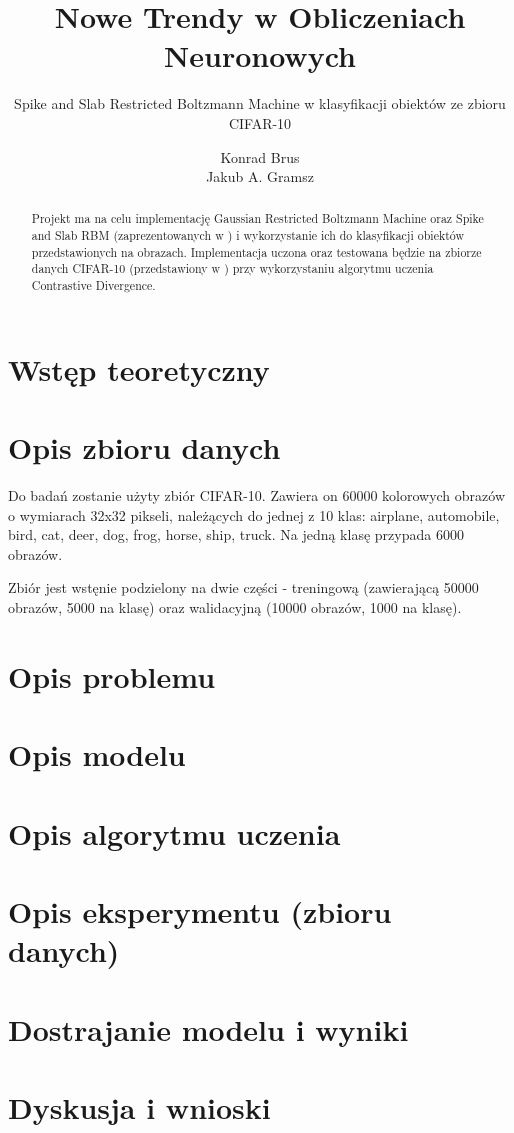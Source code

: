 \documentclass[a4paper,10pt]{article} %
\title{Nowe Trendy w Obliczeniach Neuronowych}
\subtitle{Spike and Slab Restricted Boltzmann Machine w klasyfikacji obiektów ze zbioru CIFAR-10}
\author{Konrad Brus \\ Jakub A. Gramsz}
\begin{document}
\maketitle

\begin{abstract}
Projekt ma na celu implementację Gaussian Restricted Boltzmann Machine oraz Spike and Slab RBM (zaprezentowanych w \cite{courville2013spike}) i wykorzystanie ich do klasyfikacji obiektów przedstawionych na obrazach. Implementacja uczona oraz testowana będzie na zbiorze danych CIFAR-10 (przedstawiony w \cite{cifar}) przy wykorzystaniu algorytmu uczenia Contrastive Divergence.
\end{abstract}

\section{Wstęp teoretyczny}

\section{Opis zbioru danych}
Do badań zostanie użyty zbiór CIFAR-10. Zawiera on 60000 kolorowych obrazów o wymiarach 32x32 pikseli, należących do jednej z 10 klas: airplane, automobile, bird, cat, deer, dog, frog, horse, ship, truck. Na jedną klasę przypada 6000 obrazów.

Zbiór jest wstęnie podzielony na dwie części - treningową (zawierającą 50000 obrazów, 5000 na klasę) oraz walidacyjną (10000 obrazów, 1000 na klasę).



\section{Opis problemu}

\section{Opis modelu}

\section{Opis algorytmu uczenia}

\section{Opis eksperymentu (zbioru danych)}

\section{Dostrajanie modelu i wyniki}

\section{Dyskusja i wnioski}



\nocite{*} %

\end{document}
